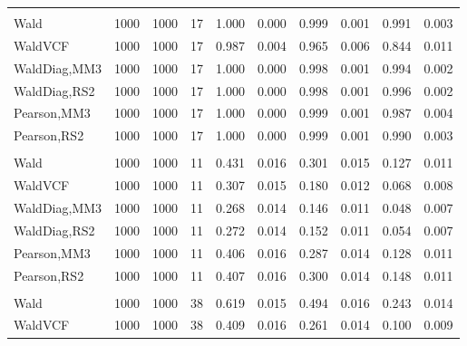 \documentclass[
]{article}
\begin{document}
\begin{table}[H]
{\begin{tabular}[t]{lrrrrrrlrr}
\addlinespace[0.3em]
\multicolumn{10}{l}{\textbf{1F 15V}}\\
\hspace{1em}Wald & 1000 & 1000 & 17 & 1.000 & 0.000 & 0.999 & 0.001 & 0.991 & 0.003\\
\hspace{1em}WaldVCF & 1000 & 1000 & 17 & 0.987 & 0.004 & 0.965 & 0.006 & 0.844 & 0.011\\
\hspace{1em}WaldDiag,MM3 & 1000 & 1000 & 17 & 1.000 & 0.000 & 0.998 & 0.001 & 0.994 & 0.002\\
\hspace{1em}WaldDiag,RS2 & 1000 & 1000 & 17 & 1.000 & 0.000 & 0.998 & 0.001 & 0.996 & 0.002\\
\hspace{1em}Pearson,MM3 & 1000 & 1000 & 17 & 1.000 & 0.000 & 0.999 & 0.001 & 0.987 & 0.004\\
\hspace{1em}Pearson,RS2 & 1000 & 1000 & 17 & 1.000 & 0.000 & 0.999 & 0.001 & 0.990 & 0.003\\
\addlinespace[0.3em]
\multicolumn{10}{l}{\textbf{2F 10V}}\\
\hspace{1em}Wald & 1000 & 1000 & 11 & 0.431 & 0.016 & 0.301 & 0.015 & 0.127 & 0.011\\
\hspace{1em}WaldVCF & 1000 & 1000 & 11 & 0.307 & 0.015 & 0.180 & 0.012 & 0.068 & 0.008\\
\hspace{1em}WaldDiag,MM3 & 1000 & 1000 & 11 & 0.268 & 0.014 & 0.146 & 0.011 & 0.048 & 0.007\\
\hspace{1em}WaldDiag,RS2 & 1000 & 1000 & 11 & 0.272 & 0.014 & 0.152 & 0.011 & 0.054 & 0.007\\
\hspace{1em}Pearson,MM3 & 1000 & 1000 & 11 & 0.406 & 0.016 & 0.287 & 0.014 & 0.128 & 0.011\\
\hspace{1em}Pearson,RS2 & 1000 & 1000 & 11 & 0.407 & 0.016 & 0.300 & 0.014 & 0.148 & 0.011\\
\addlinespace[0.3em]
\multicolumn{10}{l}{\textbf{3F 15V}}\\
\hspace{1em}Wald & 1000 & 1000 & 38 & 0.619 & 0.015 & 0.494 & 0.016 & 0.243 & 0.014\\
\hspace{1em}WaldVCF & 1000 & 1000 & 38 & 0.409 & 0.016 & 0.261 & 0.014 & 0.100 & 0.009\\

\end{tabular}}
\end{table}
\end{document}
